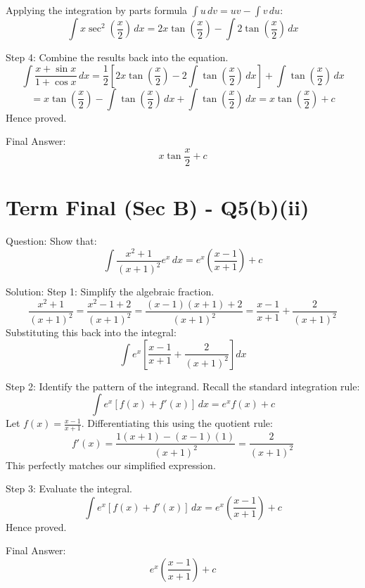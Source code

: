\documentclass{article}
\begin{document}
Applying the integration by parts formula $\int u \, dv = uv - \int v \, du$:
\[
\int x \sec^2\left(\frac{x}{2}\right) \, dx = 2x \tan\left(\frac{x}{2}\right) - \int 2\tan\left(\frac{x}{2}\right) \, dx
\]

Step 4: Combine the results back into the equation.
\[
\int \frac{x+\sin x}{1+\cos x} \, dx = \frac{1}{2} \left[ 2x\tan\left(\frac{x}{2}\right) - 2 \int \tan\left(\frac{x}{2}\right) \, dx \right] + \int \tan\left(\frac{x}{2}\right) \, dx
\]
\[
= x \tan\left(\frac{x}{2}\right) - \int \tan\left(\frac{x}{2}\right) \, dx + \int \tan\left(\frac{x}{2}\right) \, dx = x\tan\left(\frac{x}{2}\right) + c
\]
Hence proved.

Final Answer:
\[
\boxed{x \tan \frac{x}{2} + c}
\]

\section*{Term Final (Sec B) - Q5(b)(ii)}
Question:
Show that:
\[
\int \frac{x^2+1}{(x+1)^2} e^x \, dx = e^x \left(\frac{x-1}{x+1}\right) + c
\]

Solution:
Step 1: Simplify the algebraic fraction.
\[
\frac{x^2+1}{(x+1)^2} = \frac{x^2 - 1 + 2}{(x+1)^2} = \frac{(x-1)(x+1) + 2}{(x+1)^2} = \frac{x-1}{x+1} + \frac{2}{(x+1)^2}
\]
Substituting this back into the integral:
\[
\int e^x \left[ \frac{x-1}{x+1} + \frac{2}{(x+1)^2} \right] dx
\]

Step 2: Identify the pattern of the integrand.
Recall the standard integration rule:
\[
\int e^x [f(x) + f'(x)] \, dx = e^x f(x) + c
\]
Let $f(x) = \frac{x-1}{x+1}$. Differentiating this using the quotient rule:
\[
f'(x) = \frac{1(x+1) - (x-1)(1)}{(x+1)^2} = \frac{2}{(x+1)^2}
\]
This perfectly matches our simplified expression.

Step 3: Evaluate the integral.
\[
\int e^x [f(x) + f'(x)] \, dx = e^x \left(\frac{x-1}{x+1}\right) + c
\]
Hence proved.

Final Answer:
\[
\boxed{e^x \left(\frac{x-1}{x+1}\right) + c}
\]
\end{document}
